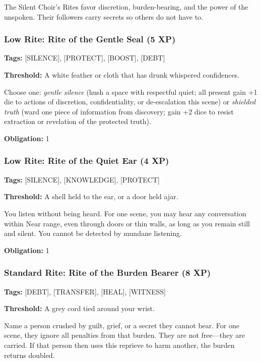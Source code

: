 The Silent Choir's Rites favor discretion, burden-bearing, and the power of the unspoken. Their followers carry secrets so others do not have to.

\subsubsection{Low Rite: Rite of the Gentle Seal (5 XP)}

\textbf{Tags:} [SILENCE], [PROTECT], [BOOST], [DEBT]

\textbf{Threshold:} A white feather or cloth that has drunk whispered confidences.

Choose one: \textit{gentle silence} (hush a space with respectful quiet; all present gain +1 die to actions of discretion, confidentiality, or de-escalation this scene) or \textit{shielded truth} (ward one piece of information from discovery; gain +2 dice to resist extraction or revelation of the protected truth).

\textbf{Obligation:} 1

\subsubsection{Low Rite: Rite of the Quiet Ear (4 XP)}

\textbf{Tags:} [SILENCE], [KNOWLEDGE], [PROTECT]

\textbf{Threshold:} A shell held to the ear, or a door held ajar.

You listen without being heard. For one scene, you may hear any conversation within Near range, even through doors or thin walls, as long as you remain still and silent. You cannot be detected by mundane listening.

\textbf{Obligation:} 1

\subsubsection{Standard Rite: Rite of the Burden Bearer (8 XP)}

\textbf{Tags:} [DEBT], [TRANSFER], [HEAL], [WITNESS]

\textbf{Threshold:} A grey cord tied around your wrist.

Name a person crushed by guilt, grief, or a secret they cannot bear. For one scene, they ignore all penalties from that burden. They are not free—they are carried. If that person then uses this reprieve to harm another, the burden returns doubled.

